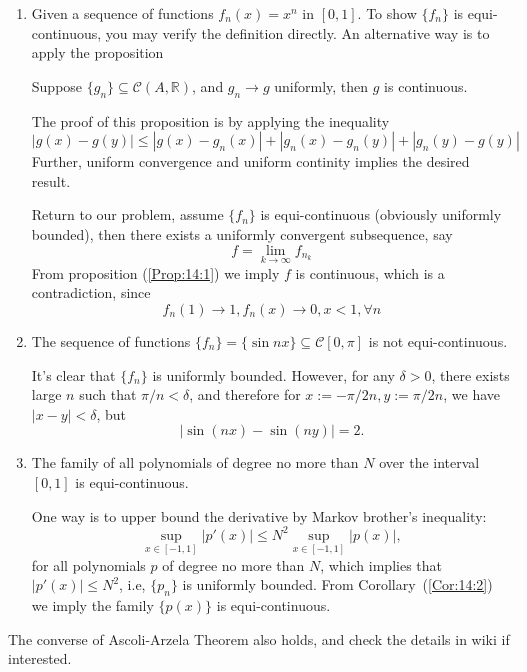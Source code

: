 \begin{example}
\begin{enumerate}
\item
Given a sequence of functions $f_n(x)=x^n$ in $[0,1]$. To show $\{f_n\}$ is equi-continuous, you may verify the definition directly. An alternative way is to apply the proposition
\begin{proposition}\label{Prop:14:1}
Suppose $\{g_n\}\subseteq\mathcal{C}(A,\mathbb{R})$, and $g_n\to g$ uniformly, then $g$ is continuous.
\end{proposition}
The proof of this proposition is by applying the inequality
\[
|g(x)-g(y)|\le |g(x)-g_n(x)|+|g_n(x)-g_n(y)|+|g_n(y)-g(y)|
\]
Further, uniform convergence and uniform continity implies the desired result.

Return to our problem, assume $\{f_n\}$ is equi-continuous (obviously uniformly bounded), then there exists a uniformly convergent subsequence, say
\[
f=\lim_{k\to \infty}f_{n_k}
\]
From proposition (\ref{Prop:14:1}) we imply $f$ is continuous, which is a contradiction, since
\[
f_n(1)\to1,f_n(x)\to0,x<1,\forall n
\]
\item
The sequence of functions $\{f_n\}=\{\sin nx\}\subseteq\mathcal{C}[0,\pi]$ is not equi-continuous.

It's clear that $\{f_n\}$ is uniformly bounded. However, for any $\delta>0$, there exists large $n$ such that $\pi/n<\delta$, and therefore for $x:=-\pi/2n,y:=\pi/2n$, we have $|x-y|<\delta$, but
\[
|\sin(nx)-\sin(ny)|=2.
\]
\item
The family of all polynomials of degree no more than $N$ over the interval $[0,1]$ is equi-continuous.

One way is to upper bound the derivative by Markov brother's inequality:
\[
\sup_{x\in[-1,1]}|p'(x)|\le N^2\sup_{x\in[-1,1]}|p(x)|,
\]
for all polynomials $p$ of degree no more than $N$, which implies that $|p'(x)|\le N^2$, i.e, $\{p_n\}$ is uniformly bounded. From Corollary~(\ref{Cor:14:2}) we imply the family $\{p(x)\}$ is equi-continuous.
\end{enumerate}
\end{example}
The converse of Ascoli-Arzela Theorem also holds, and check the details in wiki if interested.













